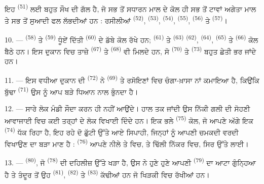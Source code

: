 ਇਹ  \textsuperscript{(51)} ਲਈ ਬਹੁਤ ਸੌਖ ਦੀ ਗੱਲ ਹੈ, ਜੋ ਸਭ ਤੋਂ ਸਧਾਰਨ ਮਾਲ
ਦੇ ਕੋਲ ਹੀ ਸਭ ਤੋਂ ਟਾਵਾਂ ਅਗੇਤਾ ਮਾਲ ਤੇ ਸਭ ਤੋਂ ਸੁਆਦੀ ਫਲ ਲੱਭਦੀਆਂ ਹਨ : ਰਸੀਲੀਆਂ
 \textsuperscript{(52)}, 
\textsuperscript{(53)},  \textsuperscript{(54)}, 
\textsuperscript{(55)},  \textsuperscript{(56)} ਤੇ 
\textsuperscript{(57)}।

\VUsaut{4.0mm}
\VUsaut{3.0mm}

10. ---  \textsuperscript{(58)} ਤੇ  \textsuperscript{(59)}
ਧੂੰਏਂ ਦਿੱਤੀ  \textsuperscript{(60)} ਦੇ ਡੱਬੇ ਕੋਲ ਰੱਖੇ ਹਨ;
 \textsuperscript{(61)} ਤੇ  \textsuperscript{(63)}
 \textsuperscript{(62)},  \textsuperscript{(64)},
 \textsuperscript{(65)} ਤੇ 
\textsuperscript{(66)} ਕੋਲ ਬੈਠੇ ਹਨ। ਇਸ ਦੁਕਾਨ ਵਿਚ ਤਾਜ਼ੇ 
\textsuperscript{(67)} ਤੇ  \textsuperscript{(68)} ਵੀ ਮਿਲਦੇ ਹਨ, ਸੋ
 \textsuperscript{(70)} ਤੇ 
\textsuperscript{(73)} ਬਹੁਤ ਛੇਤੀ ਭਰ ਜਾਂਦੇ ਹਨ।

11. --- ਇਸ ਵਧੀਆ ਦੁਕਾਨ ਦੀ  \textsuperscript{(72)} ਨੇ
 \textsuperscript{(69)} ਤੇ ਰਸੋਇਣਾਂ ਵਿਚ ਚੰਗਾ-ਖ਼ਾਸਾ ਨਾਂ ਕਮਾਇਆ ਹੈ,
ਕਿਉਂਕਿ ਬੁੱਢਾ  \textsuperscript{(71)} ਉਸ ਨੂੰ ਆਪ ਬੜੇ ਧਿਆਨ ਨਾਲ
ਭੁੰਨਦਾ ਹੈ।

\VUsaut{4.0mm}
\VUsaut{3.0mm}

12. --- ਸਾਰੇ ਲੋਕ ਮੰਡੀ ਸੌਦਾ ਕਰਨ ਹੀ ਨਹੀਂ ਆਉਂਦੇ। ਹਾਲ ਤਕ ਜਾਂਦੀ ਉਸ ਨਿੱਕੀ ਗਲੀ ਦੀ ਸੋਹਣੀ
ਆਵਾਜਾਈ ਵਿਚ ਕਈ ਤਰ੍ਹਾਂ ਦੇ ਲੋਕ ਵਿਖਾਈ ਦਿੰਦੇ ਹਨ। ਇਕ ਭਲੇ 
\textsuperscript{(75)} ਕੋਲ, ਜੋ ਆਪਣੇ ਅੱਗੇ ਇਕ  \textsuperscript{(74)}
ਧੱਕ ਰਿਹਾ ਹੈ, ਇਹ ਰਹੇ ਦੋ ਛੁੱਟੀ ਉੱਤੇ ਆਏ ਸਿਪਾਹੀ, ਜਿਨ੍ਹਾਂ ਨੂੰ ਆਪਣੀ ਚਮਕਦੀ ਵਰਦੀ ਵਿਖਾਉਣ
ਦਾ ਬੜਾ ਮਾਣ ਹੈ :  \textsuperscript{(76)} ਆਪਣੇ ਨੀਲੇ  ਤੇ
 ਵਿਚ, ਤੇ  ਢਿੱਲੀ ਨਿੱਕਰ ਵਿਚ, ਸਿਰ
ਉੱਤੇ  ਲਾਈ।

13. ---  \textsuperscript{(80)}, ਜੋ 
\textsuperscript{(78)} ਦੀ ਦਹਿਲੀਜ਼ ਉੱਤੇ ਖੜਾ ਹੈ, ਉਸ ਨੇ ਹੁਣੇ ਹੁਣੇ ਆਪਣੀ 
\textsuperscript{(79)} ਦਾ ਆਟਾ ਗੁੰਨ੍ਹਿਆ ਹੈ ਤੇ ਤੰਦੂਰ ਤੋਂ ਉਹ 
\textsuperscript{(81)},  \textsuperscript{(82)} ਤੇ
 \textsuperscript{(83)} ਕੱਢੀਆਂ ਹਨ ਜੋ ਖਿੜਕੀ ਵਿਚ ਰੱਖੀਆਂ ਹਨ।

